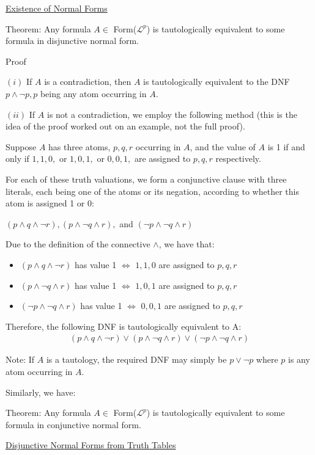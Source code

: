 \documentclass{article}
\begin{document}
\underline{Existence of Normal Forms}

Theorem: Any formula $A \in$ Form($\mathcal{L}^p$) is tautologically equivalent to some formula in disjunctive normal form. 

Proof

$(i)$ If $A$ is a contradiction, then $A$ is tautologically equivalent to the DNF $p \wedge \neg p, p$ being any atom occurring in $A$. 

$(ii)$ If $A$ is not a contradiction, we employ the following method (this is the idea of the proof worked out on an example, not the full proof). 

Suppose $A$ has three atoms, $p, q, r$ occurring in $A$, and the value of $A$ is 1 if and only if $1,1,0,$ or $1,0,1,$ or $0,0,1,$ are assigned to $p,q,r$ respectively. 

For each of these truth valuations, we form a conjunctive clause with three literals, each being one of the atoms or its negation, according to whether this atom is assigned 1 or 0:

$(p \wedge q \wedge \neg r), (p \wedge \neg q \wedge r), $ and $(\neg p \wedge \neg q \wedge r)$

Due to the definition of the connective $\wedge$, we have that:
\begin{itemize}
    \item $(p \wedge q \wedge \neg r)$ has value 1 $\iff$ $1,1,0$ are assigned to $p,q,r$
    \item $(p \wedge \neg q \wedge r)$ has value 1 $\iff$ $1,0,1$ are assigned to $p,q,r$
    \item $(\neg p \wedge \neg q \wedge r)$ has value 1 $\iff$ $0,0,1$ are assigned to $p,q,r$
\end{itemize}

Therefore, the following DNF is tautologically equivalent to A:
\begin{align*}
(p \wedge q \wedge \neg r) \vee (p \wedge \neg q \wedge r) \vee (\neg p \wedge \neg q \wedge r)
\end{align*}

Note: If $A$ is a tautology, the required DNF may simply be $p \vee \neg p$ where $p$ is any atom occurring in $A$. 



Similarly, we have:

Theorem: Any formula $A \in$ Form($\mathcal{L}^p$) is tautologically equivalent to some formula in conjunctive normal form.


\underline{Disjunctive Normal Forms from Truth Tables}
\end{document}
